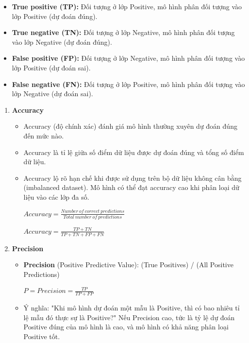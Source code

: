 \begin{itemize}
\item \textbf{True positive (TP):} Đối tượng ở lớp Positive, mô hình phân đối tượng vào lớp Positive (dự đoán đúng).
\item \textbf{True negative (TN):} Đối tượng ở lớp Negative, mô hình phân đối tượng vào lớp Negative (dự đoán đúng).
\item \textbf{False positive (FP):} Đối tượng ở lớp Negative, mô hình phân đối tượng vào lớp Positive (dự đoán sai).
\item \textbf{False negative (FN):} Đối tượng ở lớp Positive, mô hình phân đối tượng vào lớp Negative (dự đoán sai).
\end{itemize}
\begin{enumerate}
    \item \textbf{Accuracy} \cite{accuracy} 
    \begin{itemize}
        \item Accuracy (độ chính xác) đánh giá mô hình thường xuyên dự đoán đúng đến mức nào. 
        \item Accuracy là tỉ lệ giữa số điểm dữ liệu được dự đoán đúng và tổng số điểm dữ liệu.
        \item Accuracy lộ rõ hạn chế khi được sử dụng trên bộ dữ liệu không cân bằng (imbalanced dataset). Mô hình có thể đạt accuracy cao khi phân loại dữ liệu vào các lớp đa số.
        \begin{center}
        \large $Accuracy = \frac{Number\ of\ correct\ predictions }{Total\ number\ of\ predictions}$
        \end{center}
        \begin{center}
        \large $Accuracy = \frac{TP + TN}{TP + TN + FP + FN}$
        \end{center}
    \end{itemize}
    
    \item \textbf{Precision} \cite{precision_recall} 
     \begin{itemize}
        \item \textbf{Precision} (Positive Predictive Value): (True Positives) / (All Positive Predictions)
        \begin{center}
        \large $P = Precision = \frac{TP}{TP + FP}$
        \end{center}
        \item Ý nghĩa: "Khi mô hình dự đoán một mẫu là Positive, thì có bao nhiêu tỉ lệ mẫu đó thực sự là Positive?" Nếu Precision cao, tức là tỷ lệ dự đoán Positive đúng của mô hình là cao, và mô hình có khả năng phân loại Positive tốt.
    \end{itemize}


\end{enumerate}
